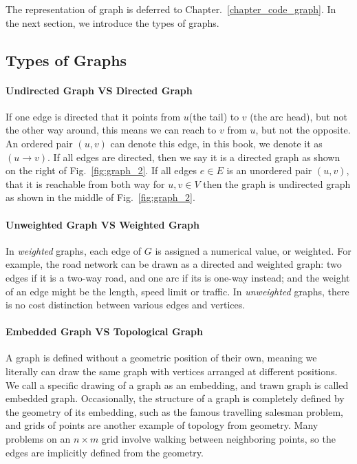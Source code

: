\documentclass[../main.tex]{subfiles}
\begin{document}
The representation of graph is deferred to Chapter.~\ref{chapter_code_graph}. In the next section, we introduce the types of graphs. 


\subsection{Types of Graphs}
\paragraph{Undirected Graph VS Directed Graph} If one edge is directed that it points from $u$(the tail) to $v$ (the arc head), but not the other way around, this means we can reach to $v$ from $u$, but not the opposite.  An ordered pair $(u, v)$ can denote this edge, in this book, we denote it as $(u \rightarrow v)$. If all edges are directed, then we say it is a directed graph as shown on the right of Fig.~\ref{fig:graph_2}. If all edges $e \in E $ is an unordered pair $(u, v)$, that it is reachable from both way for  $u, v \in V$ then the graph is undirected graph as shown in the middle of Fig.~\ref{fig:graph_2}. 

\paragraph{Unweighted Graph VS Weighted Graph} In \textit{weighted} graphs, each edge of $G$ is assigned a numerical value, or weighted. For example, the road network can be drawn as a directed and weighted graph: two edges if it is a two-way road, and one arc if its is one-way instead; and the weight of an edge might be the length, speed limit or traffic. In \textit{unweighted} graphs, there is no cost distinction between various edges and vertices. 

\paragraph{Embedded Graph VS Topological Graph} A graph is defined without a geometric position of their own, meaning we literally can draw the same graph with vertices arranged at different positions. We call a specific drawing of a graph as an embedding, and trawn graph is called embedded graph. Occasionally, the structure of a graph is completely defined by the geometry of its embedding, such as the famous travelling salesman problem, and  grids of points are another example of topology from geometry. Many problems on an $n \times m$ grid involve walking between neighboring points, so the edges are implicitly defined from the geometry.
\end{document}
